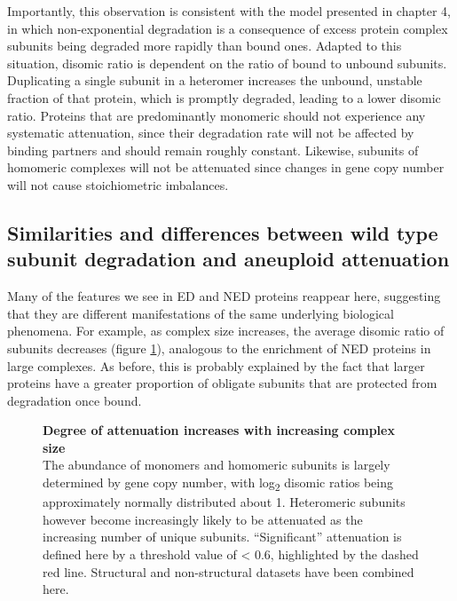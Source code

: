 \documentclass[a4paper,11pt,twoside,openright]{scrbook}
\begin{document}
Importantly, this observation is consistent with the model presented in chapter 4, in which non-exponential degradation is a consequence of excess protein complex subunits being degraded more rapidly than bound ones. Adapted to this situation, disomic ratio is dependent on the ratio of bound to unbound subunits. Duplicating a single subunit in a heteromer increases the unbound, unstable fraction of that protein, which is promptly degraded, leading to a lower disomic ratio. Proteins that are predominantly monomeric should not experience any systematic attenuation, since their degradation rate will not be affected by binding partners and should remain roughly constant. Likewise, subunits of homomeric complexes will not be attenuated since changes in gene copy number will not cause stoichiometric imbalances.

\subsection{Similarities and differences between wild type subunit degradation and aneuploid attenuation}

Many of the features we see in ED and NED proteins reappear here, suggesting that they are different manifestations of the same underlying biological phenomena. For example, as complex size increases, the average disomic ratio of subunits decreases (figure \ref{figure:aneuploidusubs}), analogous to the enrichment of NED proteins in large complexes. As before, this is probably explained by the fact that larger proteins have a greater proportion of obligate subunits that are protected from degradation once bound.

\begin{figure}[h]
    \caption[Degree of attenuation increases with increasing complex size]{\sffamily \textbf{Degree of attenuation increases with increasing complex size} \\ \small The abundance of monomers and homomeric subunits is largely determined by gene copy number, with log\textsubscript{2} disomic ratios being approximately normally distributed about 1. Heteromeric subunits however become increasingly likely to be attenuated as the increasing number of unique subunits. “Significant” attenuation is defined here by a threshold value of < 0.6, highlighted by the dashed red line. Structural and non-structural datasets have been combined here.}
    \label{figure:aneuploidusubs}
\end{figure}
\end{document}
